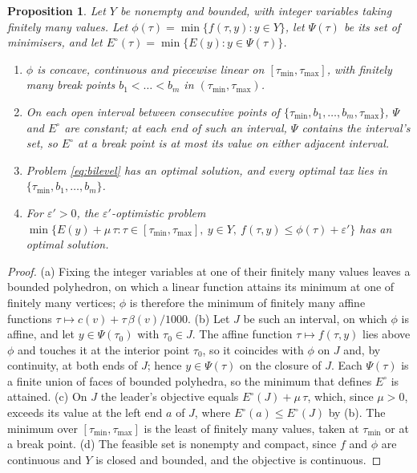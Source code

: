 \documentclass[review,11pt,nonatbib]{elsarticle}
\newtheorem{proposition}{Proposition}
\theoremstyle{remark}
\newcommand{\tmin}{\tau_{\min}}
\newcommand{\tmax}{\tau_{\max}}
\begin{document}
\begin{proposition}\label{prop:structure}
Let $Y$ be nonempty and bounded, with integer variables taking finitely many values. Let $\phi(\tau) = \min \{f(\tau, y) : y \in Y\}$, let $\Psi(\tau)$ be its set of minimisers, and let $E^\circ(\tau) = \min \{E(y) : y \in \Psi(\tau)\}$.
\begin{enumerate}
\item[(a)] $\phi$ is concave, continuous and piecewise linear on $[\tmin, \tmax]$, with finitely many break points $b_1 < \dots < b_m$ in $(\tmin, \tmax)$.
\item[(b)] On each open interval between consecutive points of $\{\tmin, b_1, \dots, b_m, \tmax\}$, $\Psi$ and $E^\circ$ are constant; at each end of such an interval, $\Psi$ contains the interval's set, so $E^\circ$ at a break point is at most its value on either adjacent interval.
\item[(c)] Problem \eqref{eq:bilevel} has an optimal solution, and every optimal tax lies in $\{\tmin, b_1, \dots, b_m\}$.
\item[(d)] For $\varepsilon' > 0$, the $\varepsilon'$-optimistic problem $\min \{E(y) + \mu\,\tau : \tau \in [\tmin, \tmax],\ y \in Y,\ f(\tau, y) \le \phi(\tau) + \varepsilon'\}$ has an optimal solution.
\end{enumerate}
\end{proposition}
\begin{proof}
(a) Fixing the integer variables at one of their finitely many values leaves a bounded polyhedron, on which a linear function attains its minimum at one of finitely many vertices; $\phi$ is therefore the minimum of finitely many affine functions $\tau \mapsto c(v) + \tau\,\beta(v)/1000$. (b) Let $J$ be such an interval, on which $\phi$ is affine, and let $y \in \Psi(\tau_0)$ with $\tau_0 \in J$. The affine function $\tau \mapsto f(\tau, y)$ lies above $\phi$ and touches it at the interior point $\tau_0$, so it coincides with $\phi$ on $J$ and, by continuity, at both ends of $J$; hence $y \in \Psi(\tau)$ on the closure of $J$. Each $\Psi(\tau)$ is a finite union of faces of bounded polyhedra, so the minimum that defines $E^\circ$ is attained. (c) On $J$ the leader's objective equals $E^\circ(J) + \mu\,\tau$, which, since $\mu > 0$, exceeds its value at the left end $a$ of $J$, where $E^\circ(a) \le E^\circ(J)$ by (b). The minimum over $[\tmin, \tmax]$ is the least of finitely many values, taken at $\tmin$ or at a break point. (d) The feasible set is nonempty and compact, since $f$ and $\phi$ are continuous and $Y$ is closed and bounded, and the objective is continuous.
\end{proof}
\end{document}
